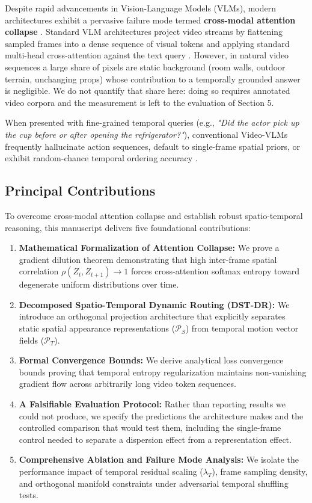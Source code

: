 \documentclass{article}
\begin{document}
Despite rapid advancements in Vision-Language Models (VLMs), modern architectures exhibit a pervasive failure mode termed \textbf{cross-modal attention collapse} \cite{arxiv_2406_00584}. Standard VLM architectures project video streams by flattening sampled frames into a dense sequence of visual tokens and applying standard multi-head cross-attention against the text query \cite{arxiv_2305_18290}. However, in natural video sequences a large share of pixels are static background (room walls, outdoor terrain, unchanging props) whose contribution to a temporally grounded answer is negligible. We do not quantify that share here: doing so requires annotated video corpora and the measurement is left to the evaluation of Section 5.

When presented with fine-grained temporal queries (e.g., \textit{"Did the actor pick up the cup before or after opening the refrigerator?"}), conventional Video-VLMs frequently hallucinate action sequences, default to single-frame spatial priors, or exhibit random-chance temporal ordering accuracy \cite{arxiv_2405_01543,crossref_10_1016_j_aei_2026_104392}.


\subsection{Principal Contributions}


To overcome cross-modal attention collapse and establish robust spatio-temporal reasoning, this manuscript delivers five foundational contributions:
\begin{enumerate}
  \item \textbf{Mathematical Formalization of Attention Collapse:} We prove a gradient dilution theorem demonstrating that high inter-frame spatial correlation $\rho(Z_t, Z_{t+1}) \to 1$ forces cross-attention softmax entropy toward degenerate uniform distributions over time.
  \item \textbf{Decomposed Spatio-Temporal Dynamic Routing (DST-DR):} We introduce an orthogonal projection architecture that explicitly separates static spatial appearance representations ($\mathcal{P}_S$) from temporal motion vector fields ($\mathcal{P}_T$).
  \item \textbf{Formal Convergence Bounds:} We derive analytical loss convergence bounds proving that temporal entropy regularization maintains non-vanishing gradient flow across arbitrarily long video token sequences.
  \item \textbf{A Falsifiable Evaluation Protocol:} Rather than reporting results we could not produce, we specify the predictions the architecture makes and the controlled comparison that would test them, including the single-frame control needed to separate a dispersion effect from a representation effect.
  \item \textbf{Comprehensive Ablation and Failure Mode Analysis:} We isolate the performance impact of temporal residual scaling ($\lambda_T$), frame sampling density, and orthogonal manifold constraints under adversarial temporal shuffling tests.
\end{enumerate}
\end{document}
